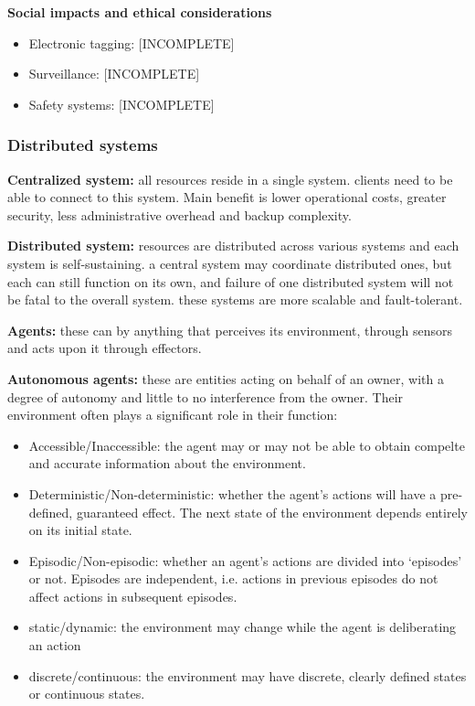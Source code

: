\documentclass{article}
\begin{document}
\textbf{Social impacts and ethical considerations}
\begin{itemize}
    \item Electronic tagging: [INCOMPLETE]
    \item Surveillance: [INCOMPLETE]
    \item Safety systems: [INCOMPLETE]
\end{itemize}

\subsubsection{Distributed systems}

\textbf{Centralized system:} all resources reside in a single system. clients
need to be able to connect to this system. Main benefit is lower operational
costs, greater security, less administrative overhead and backup complexity.

\textbf{Distributed system:} resources are distributed across various systems
and each system is self-sustaining. a central system may coordinate distributed
ones, but each can still function on its own, and failure of one distributed
system will not be fatal to the overall system. these systems are more scalable
and fault-tolerant.

\textbf{Agents:} these can by anything that perceives its environment, through
sensors and acts upon it through effectors.

\textbf{Autonomous agents:} these are entities acting on behalf of an owner,
with a degree of autonomy and little to no interference from the owner. Their
environment often plays a significant role in their function:
\begin{itemize}
    \item Accessible/Inaccessible: the agent may or may not be able to obtain
        compelte and accurate information about the environment.
    \item Deterministic/Non-deterministic: whether the agent's actions will
        have a pre-defined, guaranteed effect. The next state of the
        environment depends entirely on its initial state.
    \item Episodic/Non-episodic: whether an agent's actions are divided into
        `episodes' or not. Episodes are independent, i.e. actions in previous
        episodes do not affect actions in subsequent episodes.
    \item static/dynamic: the environment may change while the agent is
        deliberating an action
    \item discrete/continuous: the environment may have discrete, clearly
        defined states or continuous states.
\end{itemize}
\end{document}
